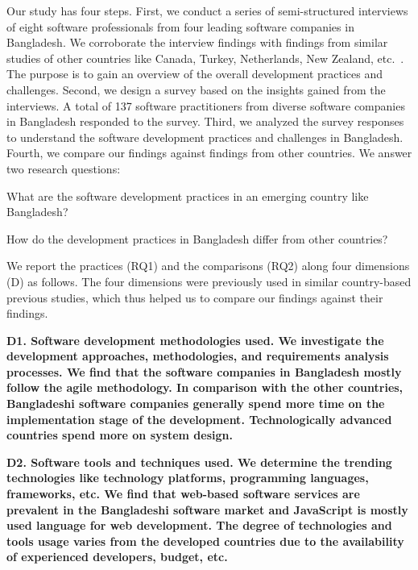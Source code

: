 Our study has four steps. First, we conduct a series of semi-structured interviews of eight software professionals from four 
leading software companies in Bangladesh. We corroborate the interview findings with findings from similar studies of 
other countries like 
Canada, Turkey, Netherlands, New Zealand, etc.~\citep{Garousi2013, Garousi2015, Vonken2012, Wang2018}. 
The purpose is to gain an overview of the overall development practices and challenges. 
Second, we design a survey based on the insights gained from the interviews. A total of 137 
software practitioners from diverse software companies in Bangladesh responded to the survey. Third, 
we analyzed the survey responses to understand the software development practices and challenges in Bangladesh. Fourth, 
we compare our findings against findings from other countries. We answer two research questions:
\begin{inparaenum}[(RQ1)]
  \item What are the software development practices in an emerging country like Bangladesh?
  \item How do the development practices in Bangladesh differ from other countries?
\end{inparaenum} We report the practices (RQ1) and the comparisons (RQ2) along four dimensions (D) as follows. The four dimensions 
were previously used in similar country-based previous studies, which thus helped us to compare our findings against their findings.

\nd\bf{D1. Software development methodologies used.} We investigate the development
approaches, methodologies, and requirements analysis processes. We find that the software
companies in Bangladesh mostly follow the agile methodology. In comparison with the
other countries, Bangladeshi software companies generally spend
more time on the implementation stage of the development. Technologically advanced countries spend more on system design.

\nd\bf{D2. Software tools and techniques used}. We determine the
trending technologies like technology platforms, programming languages,
frameworks, etc. We find that web-based software services
are prevalent in the Bangladeshi software market and JavaScript is mostly used language for web
development. The degree of technologies and tools usage varies
from the developed countries due to the availability of experienced developers,
budget, etc. 

